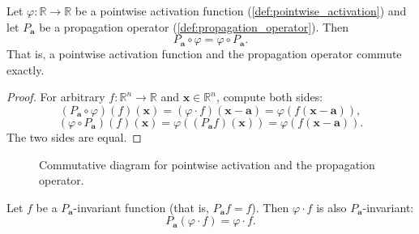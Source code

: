 \begin{proposition}\label{prop:pointwise_activation_commutes}
Let $\varphi:\mathbb{R}\to\mathbb{R}$ be a pointwise activation function (\cref{def:pointwise_activation}) and let $P_{\mathbf{a}}$ be a propagation operator (\cref{def:propagation_operator}). Then
\[
\boxed{\ P_{\mathbf{a}}\circ\varphi = \varphi\circ P_{\mathbf{a}}.\ }
\]
That is, a pointwise activation function and the propagation operator commute exactly.
\end{proposition}

\begin{proof}
For arbitrary $f:\mathbb{R}^n\to\mathbb{R}$ and $\mathbf{x}\in\mathbb{R}^n$, compute both sides:
\[
(P_{\mathbf{a}}\circ\varphi)(f)(\mathbf{x}) = (\varphi\cdot f)(\mathbf{x}-\mathbf{a}) = \varphi(f(\mathbf{x}-\mathbf{a})),
\]
\[
(\varphi\circ P_{\mathbf{a}})(f)(\mathbf{x}) = \varphi((P_{\mathbf{a}}f)(\mathbf{x})) = \varphi(f(\mathbf{x}-\mathbf{a})).
\]
The two sides are equal.
\end{proof}

\begin{figure}[htbp]
\centering
{}
\caption{Commutative diagram for pointwise activation and the propagation operator.}
\label{fig:pointwise_commute}
\end{figure}

\begin{corollary}\label{cor:pointwise_preserves_translation}
Let $f$ be a $P_{\mathbf{a}}$-invariant function (that is, $P_{\mathbf{a}}f = f$). Then $\varphi\cdot f$ is also $P_{\mathbf{a}}$-invariant:
\[
P_{\mathbf{a}}(\varphi\cdot f) = \varphi\cdot f.
\]
\end{corollary}

